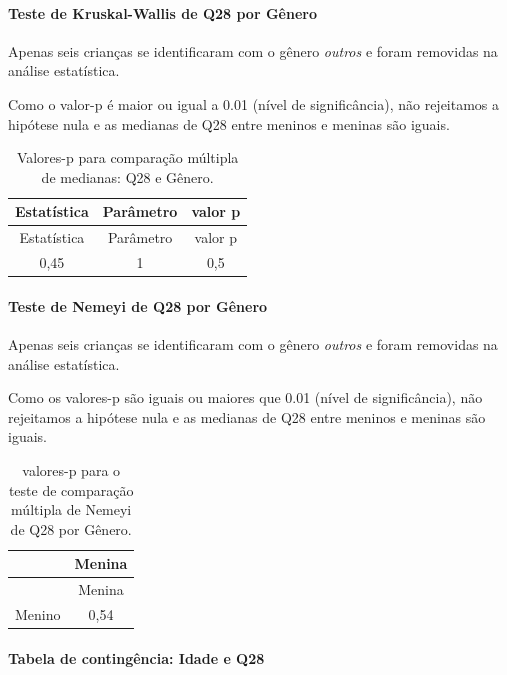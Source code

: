 \documentclass[]{article}
\let\oldparagraph\paragraph
\renewcommand{\paragraph}[1]{\oldparagraph{#1}\mbox{}}
\begin{document}
\hypertarget{teste-de-kruskal-wallis-de-q28-por-guxeanero}{%
\paragraph{Teste de Kruskal-Wallis de Q28 por Gênero}\label{teste-de-kruskal-wallis-de-q28-por-guxeanero}}

Apenas seis crianças se identificaram com o gênero \emph{outros} e foram removidas na análise estatística.

Como o valor-p é maior ou igual a 0.01 (nível de significância), não rejeitamos a hipótese nula e as medianas de Q28 entre meninos e meninas são iguais.

\begin{longtable}[]{@{}ccc@{}}
\caption{\label{tab:unnamed-chunk-855}Valores-p para comparação múltipla de medianas: Q28 e Gênero.}\tabularnewline
\toprule
Estatística & Parâmetro & valor p\tabularnewline
\midrule
\endfirsthead
\toprule
Estatística & Parâmetro & valor p\tabularnewline
\midrule
\endhead
0,45 & 1 & 0,5\tabularnewline
\bottomrule
\end{longtable}

\hypertarget{teste-de-nemeyi-de-q28-por-guxeanero}{%
\paragraph{Teste de Nemeyi de Q28 por Gênero}\label{teste-de-nemeyi-de-q28-por-guxeanero}}

Apenas seis crianças se identificaram com o gênero \emph{outros} e foram removidas na análise estatística.

Como os valores-p são iguais ou maiores que 0.01 (nível de significância), não rejeitamos a hipótese nula e as medianas de Q28 entre meninos e meninas são iguais.

\begin{longtable}[]{@{}lc@{}}
\caption{\label{tab:unnamed-chunk-857}valores-p para o teste de comparação múltipla de Nemeyi de Q28 por Gênero.}\tabularnewline
\toprule
& Menina\tabularnewline
\midrule
\endfirsthead
\toprule
& Menina\tabularnewline
\midrule
\endhead
Menino & 0,54\tabularnewline
\bottomrule
\end{longtable}

\cleardoublepage

\hypertarget{tabela-de-continguxeancia-idade-e-q28}{%
\paragraph{Tabela de contingência: Idade e Q28}\label{tabela-de-continguxeancia-idade-e-q28}}
\end{document}
